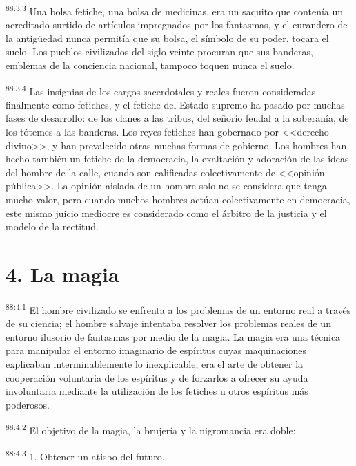 \par
\textsuperscript{88:3.3} Una bolsa fetiche, una bolsa de medicinas, era un saquito que contenía un acreditado surtido de artículos impregnados por los fantasmas, y el curandero de la antig\"uedad nunca permitía que su bolsa, el símbolo de su poder, tocara el suelo. Los pueblos civilizados del siglo veinte procuran que sus banderas, emblemas de la conciencia nacional, tampoco toquen nunca el suelo.

\par
\textsuperscript{88:3.4} Las insignias de los cargos sacerdotales y reales fueron consideradas finalmente como fetiches, y el fetiche del Estado supremo ha pasado por muchas fases de desarrollo: de los clanes a las tribus, del señorío feudal a la soberanía, de los tótemes a las banderas. Los reyes fetiches han gobernado por <<derecho divino>>, y han prevalecido otras muchas formas de gobierno. Los hombres han hecho también un fetiche de la democracia, la exaltación y adoración de las ideas del hombre de la calle, cuando son calificadas colectivamente de <<opinión pública>>. La opinión aislada de un hombre solo no se considera que tenga mucho valor, pero cuando muchos hombres actúan colectivamente en democracia, este mismo juicio mediocre es considerado como el árbitro de la justicia y el modelo de la rectitud.

\section*{4. La magia}
\par
\textsuperscript{88:4.1} El hombre civilizado se enfrenta a los problemas de un entorno real a través de su ciencia; el hombre salvaje intentaba resolver los problemas reales de un entorno ilusorio de fantasmas por medio de la magia. La magia era una técnica para manipular el entorno imaginario de espíritus cuyas maquinaciones explicaban interminablemente lo inexplicable; era el arte de obtener la cooperación voluntaria de los espíritus y de forzarlos a ofrecer su ayuda involuntaria mediante la utilización de los fetiches u otros espíritus más poderosos.

\par
\textsuperscript{88:4.2} El objetivo de la magia, la brujería y la nigromancia era doble:

\par
\textsuperscript{88:4.3} 1. Obtener un atisbo del futuro.

